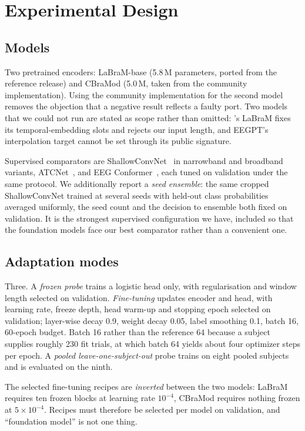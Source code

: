 \section{Experimental Design}
\label{sec:design}

\subsection{Models}
Two pretrained encoders: LaBraM-base (5.8\,M parameters, ported from the
reference release) and CBraMod (5.0\,M, taken from the community
 implementation). Using the community implementation for
the second model removes the objection that a negative result reflects a faulty
port. Two models that we could not run are stated as scope rather than
omitted: 's LaBraM fixes its temporal-embedding slots and
rejects our input length, and EEGPT's interpolation target cannot be set
through its public signature.

Supervised comparators are ShallowConvNet~\cite{schirrmeister2017deep} in
narrowband and broadband variants, ATCNet~\cite{altaheri2023atcnet}, and EEG
Conformer~\cite{song2023conformer}, each tuned on validation under the same
protocol. We additionally report a \emph{seed ensemble}: the same cropped
ShallowConvNet trained at several seeds with held-out class probabilities
averaged uniformly, the seed count and the decision to ensemble both fixed on
validation. It is the strongest supervised configuration we have, included so
that the foundation models face our best comparator rather than a convenient
one.

\subsection{Adaptation modes}
Three. A \emph{frozen probe} trains a logistic head only, with regularisation
and window length selected on validation. \emph{Fine-tuning} updates encoder
and head, with learning rate, freeze depth, head warm-up and stopping epoch
selected on validation; layer-wise decay 0.9, weight decay 0.05, label
smoothing 0.1, batch 16, 60-epoch budget. Batch 16 rather than the reference 64
because a subject supplies roughly 230 fit trials, at which batch 64 yields
about four optimizer steps per epoch. A \emph{pooled leave-one-subject-out}
probe trains on eight pooled subjects and is evaluated on the ninth.

The selected fine-tuning recipes are \emph{inverted} between the two models:
LaBraM requires ten frozen blocks at learning rate $10^{-4}$, CBraMod requires
nothing frozen at $5\times10^{-4}$. Recipes must therefore be selected per
model on validation, and ``foundation model'' is not one thing.

